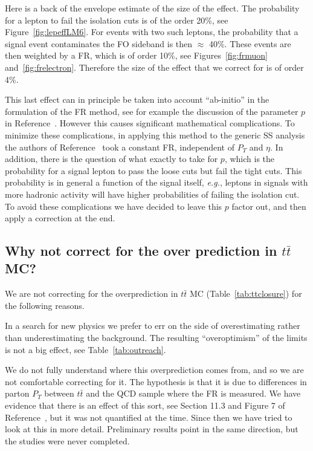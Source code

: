 Here is a back of the envelope estimate of the size of the effect.
The probability for a lepton to fail the isolation cuts is of the 
order 20\%, see Figure~\ref{fig:lepeffLM6}.  For events with two 
such leptons, the probability that a signal event contaminates
the FO sideband is then $\approx$ 40\%.  These events are then 
weighted by a FR, which is of order 10\%, see 
Figures~\ref{fig:frmuon} and~\ref{fig:frelectron}.  Therefore
the size of the effect that we correct for is of order 4\%.

This last effect can in principle be taken into account ``ab-initio''
in the formulation of the FR method, see for example the discussion
of the parameter $p$ in Reference~\cite{eth}.  However this
causes significant mathematical complications.  To minimize
these complications,  
in applying this method to the generic SS analysis the authors of
Reference~\cite{eth} took a constant FR, independent of $P_T$
and $\eta$.  In addition, there is the question of what exactly
to take for $p$, which is the probability for a signal
lepton to pass the loose cuts but fail the tight cuts.  This
probability is in general a function of the signal itself, {\em
e.g.}, leptons in signals with more hadronic activity will have 
higher probabilities of failing the isolation cut.
To avoid these complications we have decided to leave this 
$p$ factor out, and then apply a correction at the end.



\subsection{Why not correct for the over prediction in $t\bar{t}$ MC?}
\label{sec:frcorrect}

We are not correcting for the overprediction in $t\bar{t}$ MC
(Table~\ref{tab:ttclosure}) for the following reasons.

In a search for new physics we prefer to err on the side of 
overestimating rather than underestimating the background.  The 
resulting ``overoptimism'' of the limits is not a big effect, 
see Table~\ref{tab:outreach}.

We do not fully understand where this overprediction 
comes from, and so we are not comfortable correcting for it.  
The hypothesis is that it is due to differences
in parton $P_T$ between $t\bar{t}$ and the QCD sample where
the FR is measured.  We have evidence that there is
an effect of this sort,
see Section 11.3 and Figure 7 of Reference~\cite{frmethod},
but it was not quantified at the time.  Since then we have 
tried to look at this in more detail. Preliminary results
point in the same direction, but the studies were never completed.

